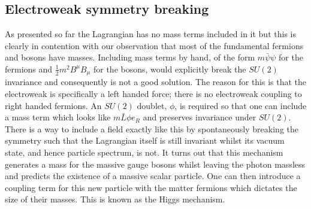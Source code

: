 \subsection{Electroweak symmetry breaking}

As presented so far the \SM Lagrangian has no mass terms included in it but this is clearly in contention with our observation that most of the fundamental fermions and bosons have masses. Including mass terms by hand, of the form $m\bar{\psi}\psi$ for the fermions and $\frac{1}{2}m^{2}B^{\mu}B_{\mu}$ for the bosons, would explicitly break the $SU(2)$ invariance and consequently is not a good solution. The reason for this is that the electroweak is specifically a left handed force; there is no electroweak coupling to right handed fermions. An $SU(2)$ doublet, $\phi$, is required so that one can include a mass term which looks like $m\bar{L}\phi e_{R}$ and preserves invariance under $SU(2)$. There is a way to include a field exactly like this by spontaneously breaking the symmetry such that the Lagrangian itself is still invariant whilst its vacuum state, and hence particle spectrum, is not. It turns out that this mechanism generates a mass for the massive gauge bosons whilst leaving the photon massless and predicts the existence of a massive scalar particle. One can then introduce a coupling term for this new particle with the matter fermions which dictates the size of their masses. This is known as the Higgs mechanism.

